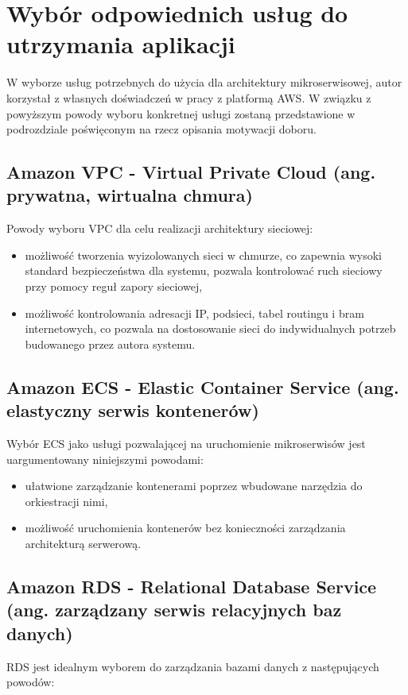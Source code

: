 \documentclass[12pt,oneside]{book}
\begin{document}
    \section{Wybór odpowiednich usług do utrzymania aplikacji}
    W wyborze usług potrzebnych do użycia dla architektury mikroserwisowej, autor korzystał z własnych doświadczeń w pracy z platformą AWS. W związku z powyższym powody wyboru konkretnej usługi zostaną przedstawione w podrozdziale poświęconym na rzecz opisania motywacji doboru.

    \subsection{Amazon VPC - Virtual Private Cloud (ang. prywatna, wirtualna chmura)}
    Powody wyboru VPC dla celu realizacji architektury sieciowej:

    \begin{itemize}
        \item możliwość tworzenia wyizolowanych sieci w chmurze, co zapewnia wysoki standard bezpieczeństwa dla systemu, pozwala kontrolować ruch sieciowy przy pomocy reguł zapory sieciowej,
        \item możliwość kontrolowania adresacji IP, podsieci, tabel routingu i bram internetowych, co pozwala na dostosowanie sieci do indywidualnych potrzeb budowanego przez autora systemu. \cite{aws.vpc}
    \end{itemize}

    \subsection{Amazon ECS - Elastic Container Service (ang. elastyczny serwis kontenerów)}
    Wybór ECS jako usługi pozwalającej na uruchomienie mikroserwisów jest uargumentowany niniejszymi powodami:

    \begin{itemize}
        \item ułatwione zarządzanie kontenerami poprzez wbudowane narzędzia do orkiestracji nimi,
        \item możliwość uruchomienia kontenerów bez konieczności zarządzania architekturą serwerową. \cite{aws.ecs}
    \end{itemize}

    \subsection{Amazon RDS - Relational Database Service (ang. zarządzany serwis relacyjnych baz danych)}
    RDS jest idealnym wyborem do zarządzania bazami danych z następujących powodów:
\end{document}
